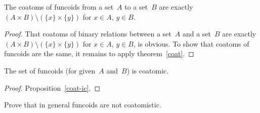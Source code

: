 \begin{thm}
The coatoms of funcoids from a set~$A$ to a set~$B$ are exactly
$(A\times B)\setminus(\{x\}\times\{y\})$ for $x\in A$, $y\in B$.\end{thm}
\begin{proof}
That coatoms of binary relations between a set~$A$ and a set~$B$
are exactly $(A\times B)\setminus(\{x\}\times\{y\})$ for $x\in A$,
$y\in B$, is obvious. To show that coatoms of funcoids are the same,
it remains to apply theorem~\ref{coat}.\end{proof}
\begin{thm}
The set of funcoids (for given~$A$ and~$B$) is coatomic.\end{thm}
\begin{proof}
Proposition~\ref{coat-ic}.\end{proof}
\begin{xca}
Prove that in general funcoids are not coatomistic.\end{xca}

